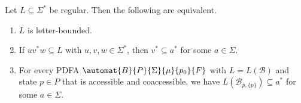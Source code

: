 \begin{proposition}\label{constr_sync:prop:letterboundedreg}
	Let $L \subseteq \Sigma^*$ be regular. Then the following are equivalent.
	\begin{enumerate}
		\item \label{constr_sync:prop:letterboundedreg:item:letterbounded} $L$ is letter-bounded.
		
		\item \label{constr_sync:prop:letterboundedreg:item:uvw} If $uv^*w \subseteq L$ with $u,v,w \in \Sigma^*$, then $v^* \subseteq a^*$ for some $a \in \Sigma$.
		
		\item \label{constr_sync:prop:letterboundedreg:item:PDFA} For every PDFA $\automat{B}{P}{\Sigma}{\mu}{p_0}{F}$
		with $L = L(\mathcal B)$ and state $p \in P$
		that is accessible and coaccessible, we have $L(\mathcal B_{p,\{p\}}) \subseteq a^*$ for some $a \in \Sigma$.
	\end{enumerate} 	
\end{proposition}
